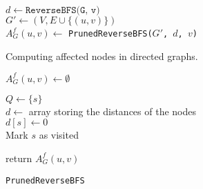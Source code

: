 \begin{algorithm2e}[h!]
 \label{alg:affectedNodesDirected}
   $d \gets \texttt{ReverseBFS(G, v)}$ \label{alg:reverseBFSCall} \\
   
   $G' \gets (V, E \cup \{(u, v)\})$ \label{alg:affectedNodesNewInstance} \\
   
   $A_G^f(u, v) \gets$ \texttt{PrunedReverseBFS($G'$, $d$, $v$)}
   
 \caption{Computing affected nodes in directed graphs.}
\end{algorithm2e}



\begin{algorithm2e}[h!]
 \label{alg:prunedReverseBFS}
   $A_G^f(u, v) \gets \emptyset$
   
   $Q \gets \{s\}$  \\  
   
   $d \gets $ array storing the distances of the nodes \\
   $d[s] \gets 0$ \\
   Mark $s$ as visited \\
   
   return $A_G^f(u, v)$ 
   
 \caption{\texttt{PrunedReverseBFS}}
\end{algorithm2e}

